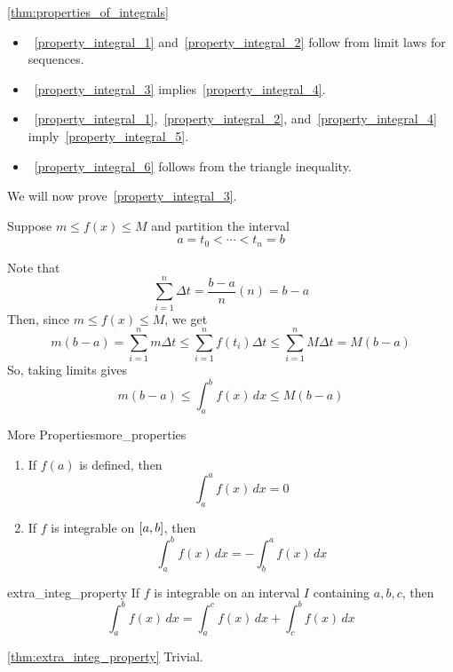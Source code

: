 \begin{Proof}{\ref{thm:properties_of_integrals}}{}
    \begin{itemize}
        \item~\ref{property_integral_1} and~\ref{property_integral_2} follow from limit laws
              for sequences.
        \item~\ref{property_integral_3} implies~\ref{property_integral_4}.
        \item~\ref{property_integral_1},~\ref{property_integral_2},
              and~\ref{property_integral_4} imply~\ref{property_integral_5}.
        \item~\ref{property_integral_6} follows from the triangle inequality.
    \end{itemize}

    We will now prove~\ref{property_integral_3}.

    Suppose $ m\le f(x)\le M $ and partition the interval
    \[ a=t_0<\cdots<t_n=b \]

    Note that
    \[ \sum\limits_{i=1}^{n} \Delta t=\frac{b-a}{n}(n)=b-a \]
    Then, since $ m\le f(x)\le M $, we get
    \[ m(b-a)=\sum\limits_{i=1}^{n} m\Delta t\le \sum\limits_{i=1}^{n} f(t_i)\Delta t
        \le \sum\limits_{i=1}^{n} M\Delta t=M(b-a) \]
    So, taking limits gives
    \[ m(b-a)\le \int_{a}^{b} f(x)\,d{x} \le M(b-a) \]
\end{Proof}

\begin{Definition}{More Properties}{more_properties}
    \begin{enumerate}[label=(\Roman*)]
        \item If $ f(a) $ is defined, then
              \[ \int_{a}^{a} f(x)\, d{x} =0 \]
        \item If $ f $ is integrable on $ \interval{a}{b} $, then
              \[ \int_{a}^{b} f(x)\, d{x}=-\int_{b}^{a} f(x)\, d{x} \]
    \end{enumerate}
\end{Definition}

\begin{Theorem}{}{extra_integ_property}
    If $ f $ is integrable on an interval $ I $ containing $ a,b,c $, then
    \[ \int_{a}^{b} f(x)\, d{x}=\int_{a}^{c} f(x)\, d{x}+\int_{c}^{b} f(x)\, d{x} \]
\end{Theorem}

\begin{Proof}{\ref{thm:extra_integ_property}}{}
    Trivial.
\end{Proof}

